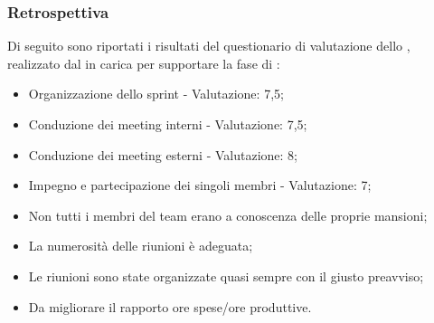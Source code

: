\subsubsection{Retrospettiva}
\par Di seguito sono riportati i risultati del questionario di valutazione dello , realizzato dal \Responsabile{} in carica per supportare la fase di :
\begin{itemize}
  \item Organizzazione dello sprint - Valutazione: 7,5;
  \item Conduzione dei meeting interni - Valutazione: 7,5;
  \item Conduzione dei meeting esterni - Valutazione: 8;
  \item Impegno e partecipazione dei singoli membri - Valutazione: 7;
  \item Non tutti i membri del team erano a conoscenza delle proprie mansioni;
  \item La numerosità delle riunioni è adeguata;
  \item Le riunioni sono state organizzate quasi sempre con il giusto preavviso;
  \item Da migliorare il rapporto ore spese/ore produttive.
\end{itemize}

